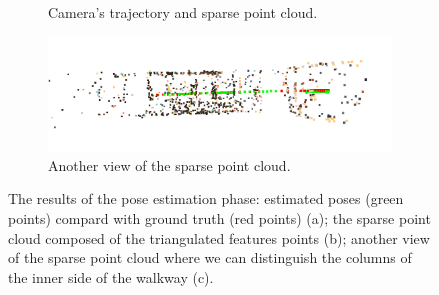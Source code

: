 \begin{figure}[h]
\begin{subfigure}{0.45\linewidth}
\caption{Camera's trajectory and sparse point cloud.}
\label{fig:trajectory2}
\end{subfigure}
\begin{subfigure}{\linewidth}
\includegraphics[width=0.8\linewidth]{img/snapshot02.png}
\caption{Another view of the sparse point cloud.}
\label{fig:trajectory3}
\end{subfigure}
\caption{The results of the pose estimation phase: estimated poses (green
points) compard with ground truth (red points) (a); the sparse point cloud
composed of the triangulated features points (b); another view of the sparse
point cloud where we can distinguish the columns of the inner side of the
walkway (c).}
\label{fig:trajectory}
\end{figure}
%
